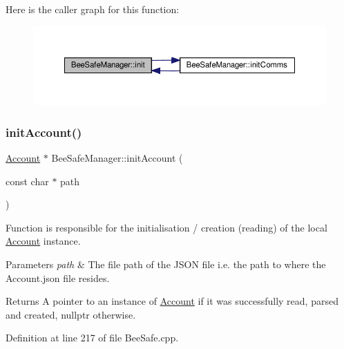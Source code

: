 Here is the caller graph for this function\+:
\nopagebreak
\begin{figure}[H]
\begin{center}
\leavevmode
\includegraphics[width=350pt]{d5/d75/class_bee_safe_manager_a2f16b09c454e21c887d14ac5483973cf_icgraph}
\end{center}
\end{figure}
\mbox{\label{class_bee_safe_manager_a7395aeacd246ce69c65f255a2eab1d04}} 
\subsubsection{\texorpdfstring{init\+Account()}{initAccount()}}
{\footnotesize\ttfamily \hyperlink{class_account}{Account} $\ast$ Bee\+Safe\+Manager\+::init\+Account (\begin{DoxyParamCaption}\item[{const char $\ast$}]{path }\end{DoxyParamCaption})\hspace{0.3cm}{\ttfamily [private]}}

Function is responsible for the initialisation / creation (reading) of the local \hyperlink{class_account}{Account} instance.


\begin{DoxyParams}{Parameters}
{\em path} & The file path of the J\+S\+ON file i.\+e. the path to where the Account.\+json file resides. \\
\hline
\end{DoxyParams}
\begin{DoxyReturn}{Returns}
A pointer to an instance of \hyperlink{class_account}{Account} if it was successfully read, parsed and created, nullptr otherwise. 
\end{DoxyReturn}


Definition at line 217 of file Bee\+Safe.\+cpp.


